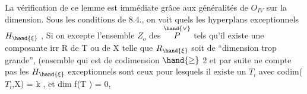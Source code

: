 La vérification de ce lemme est immédiate grâce aux généralités
de $O_{IV}$ sur la dimension. Sous les conditions de 8.4., on voit  quels 
les hyperplans exceptionnels $H_{\hand{\xi}}$ 
, Si
on excepte l'ensemble $Z_o$ des \hand{$\xi\in$} $\overset{\hand{\vee}}{P}$ tels qu'il existe une composante
irr R de T ou de X telle  que $R_{\hand{\xi}}$ soit de ``dimension trop grande'',
 (ensemble qui est de codimension $\hand{\geq}$ 2 et par suite ne compte pas
les $H_{\hand{\xi}}$  exceptionnels sont ceux pour lesquels il existe
un $T_i$ avec codim($T_i$,X) = k , et  dim f(T ) = 0,

